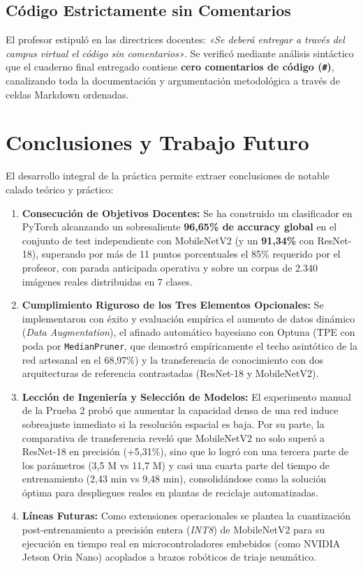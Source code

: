 \documentclass[11pt,a4paper]{article}
\begin{document}
\subsection{Código Estrictamente sin Comentarios}
El profesor estipuló en las directrices docentes: \textit{«Se deberá entregar a través del campus virtual el código sin comentarios»}. Se verificó mediante análisis sintáctico que el cuaderno final entregado contiene \textbf{cero comentarios de código (\texttt{\#})}, canalizando toda la documentación y argumentación metodológica a través de celdas Markdown ordenadas.

\FloatBarrier
\section{Conclusiones y Trabajo Futuro}

El desarrollo integral de la práctica permite extraer conclusiones de notable calado teórico y práctico:
\begin{enumerate}
    \item \textbf{Consecución de Objetivos Docentes:} Se ha construido un clasificador en PyTorch alcanzando un sobresaliente \textbf{96,65\% de accuracy global} en el conjunto de test independiente con MobileNetV2 (y un \textbf{91,34\%} con ResNet-18), superando por más de 11 puntos porcentuales el 85\% requerido por el profesor, con parada anticipada operativa y sobre un corpus de 2.340 imágenes reales distribuidas en 7 clases.
    \item \textbf{Cumplimiento Riguroso de los Tres Elementos Opcionales:} Se implementaron con éxito y evaluación empírica el aumento de datos dinámico (\textit{Data Augmentation}), el afinado automático bayesiano con Optuna (TPE con poda por \texttt{MedianPruner}, que demostró empíricamente el techo asintótico de la red artesanal en el 68,97\%) y la transferencia de conocimiento con dos arquitecturas de referencia contrastadas (ResNet-18 y MobileNetV2).
    \item \textbf{Lección de Ingeniería y Selección de Modelos:} El experimento manual de la Prueba 2 probó que aumentar la capacidad densa de una red induce sobreajuste inmediato si la resolución espacial es baja. Por su parte, la comparativa de transferencia reveló que MobileNetV2 no solo superó a ResNet-18 en precisión (+5,31\%), sino que lo logró con una tercera parte de los parámetros (3,5 M vs 11,7 M) y casi una cuarta parte del tiempo de entrenamiento (2,43 min vs 9,48 min), consolidándose como la solución óptima para despliegues reales en plantas de reciclaje automatizadas.
    \item \textbf{Líneas Futuras:} Como extensiones operacionales se plantea la cuantización post-entrenamiento a precisión entera (\textit{INT8}) de MobileNetV2 para su ejecución en tiempo real en microcontroladores embebidos (como NVIDIA Jetson Orin Nano) acoplados a brazos robóticos de triaje neumático.
\end{enumerate}
\end{document}
